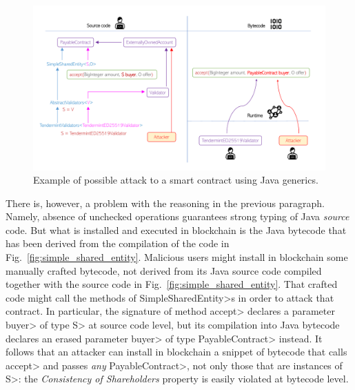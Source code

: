 \begin{figure}[ht]
\centering
\includegraphics[width=0.9\linewidth]{figures/attack}
\caption{Example of possible attack to a smart contract using Java generics.}
\label{figure.attack}
\end{figure}

There is, however, a problem with the reasoning
in the previous paragraph. Namely, absence of unchecked
operations guarantees strong typing of Java \emph{source} code. But what is installed
and executed in blockchain is the Java bytecode that has been derived from
the compilation of the code in Fig.~\ref{fig:simple_shared_entity}.
Malicious users might install in blockchain some manually crafted bytecode,
not derived from its Java source code compiled together with the source code
in Fig.~\ref{fig:simple_shared_entity}.
That crafted code might
call the methods of \<SimpleSharedEntity>s in order to attack
that contract. In particular,
the signature of method \<accept> declares a parameter \<buyer> of type \<S> at source code level, but
its compilation into Java bytecode declares an erased
parameter \<buyer> of type \<PayableContract> instead.
It follows that an attacker can install in blockchain a snippet of bytecode that calls
\<accept> and passes \emph{any} \<PayableContract>, not only those that are instances of \<S>:
the \emph{Consistency of Shareholders} property is easily violated at bytecode level.





